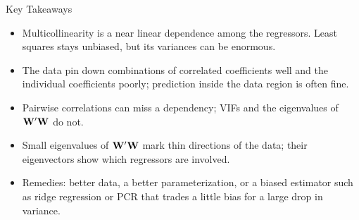 \begin{frame}{Key Takeaways}
    \begin{itemize}
        \item Multicollinearity is a near linear dependence among the regressors. Least squares stays unbiased, but its variances can be enormous.
        \item The data pin down combinations of correlated coefficients well and the individual coefficients poorly; prediction inside the data region is often fine.
        \item Pairwise correlations can miss a dependency; VIFs and the eigenvalues of $\mathbf{W}'\mathbf{W}$ do not.
        \item Small eigenvalues of $\mathbf{W}'\mathbf{W}$ mark thin directions of the data; their eigenvectors show which regressors are involved.
        \item Remedies: better data, a better parameterization, or a biased estimator such as ridge regression or PCR that trades a little bias for a large drop in variance.
    \end{itemize}
\end{frame}
